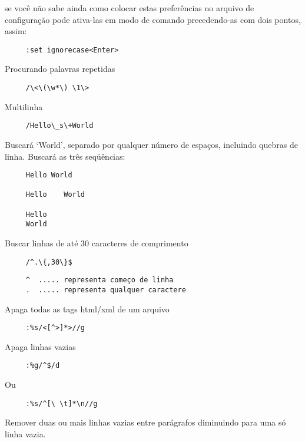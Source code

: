 se você não sabe ainda como colocar estas preferências no arquivo de configuração pode
ativa-las em modo de comando precedendo-as com dois pontos, assim:

\begin{verbatim}
     :set ignorecase<Enter>
\end{verbatim}

Procurando palavras repetidas

\begin{verbatim}
     /\<\(\w*\) \1\>
\end{verbatim}

Multilinha

\begin{verbatim}
     /Hello\_s\+World
\end{verbatim}

Buscará `World', separado por qualquer número de espaços,
incluindo quebras de linha. Buscará as três seqüências:

\begin{verbatim}
     Hello World
     
     Hello    World
     
     Hello
     World
\end{verbatim}

Buscar linhas de até 30 caracteres de comprimento

\begin{verbatim}
     /^.\{,30\}$
\end{verbatim}

\begin{verbatim}
     ^  ..... representa começo de linha
     .  ..... representa qualquer caractere
\end{verbatim}

Apaga todas as tags html/xml de um arquivo

\begin{verbatim}
     :%s/<[^>]*>//g
\end{verbatim}

Apaga linhas vazias

\begin{verbatim}
     :%g/^$/d
\end{verbatim}

Ou

\begin{verbatim}
     :%s/^[\ \t]*\n//g
\end{verbatim}

Remover duas ou mais linhas vazias entre parágrafos diminuindo para
uma só linha vazia.

